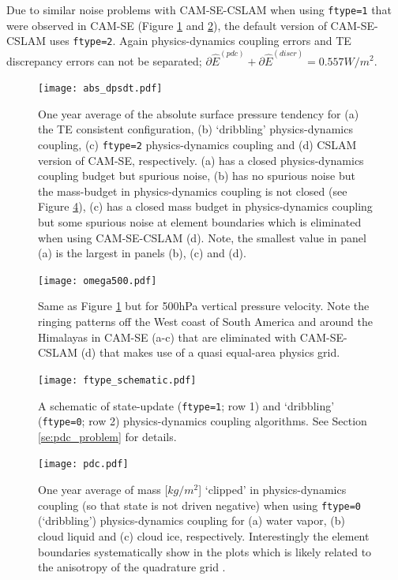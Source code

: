 \documentclass[draft,linenumbers]{agujournal}
\newcommand*{\gi}[1]{\widehat{#1}}
\begin{document}
Due to similar noise problems with CAM-SE-CSLAM when using {\tt{ftype=1}} that were observed in CAM-SE (Figure \ref{fig:abs_dpsdt} and \ref{fig:omega500}), the default version of CAM-SE-CSLAM uses {\tt{ftype=2}}. Again physics-dynamics coupling errors and TE discrepancy errors can not be separated; $\partial \gi{E}^{({pdc})}+\partial \gi{E}^{({discr})} = 0.557W/m^2$.

 \begin{figure}
 \centering
 \texttt{[image: abs\_dpsdt.pdf]}
 \caption{One year average of the absolute surface pressure tendency for (a) the TE consistent configuration, (b) `dribbling' physics-dynamics coupling, (c) {\tt{ftype=2}} physics-dynamics coupling and (d) CSLAM version of CAM-SE, respectively. (a) has a closed physics-dynamics coupling budget but spurious noise, (b) has no spurious noise but the mass-budget in physics-dynamics coupling is not closed (see Figure \ref{fig:pdc}), (c) has a closed mass budget in physics-dynamics coupling but some spurious noise at element boundaries which is eliminated when using CAM-SE-CSLAM (d). Note, the smallest value in panel (a) is the largest in panels (b), (c) and (d).}
 \label{fig:abs_dpsdt}
  \end{figure}


 \begin{figure}
 \centering
 \texttt{[image: omega500.pdf]}
 \caption{Same as Figure \ref{fig:abs_dpsdt} but for 500hPa vertical pressure velocity. Note the ringing patterns off the West coast of South America and around the Himalayas in CAM-SE (a-c) that are eliminated with CAM-SE-CSLAM (d) that makes use of a quasi equal-area physics grid.}
 \label{fig:omega500}
  \end{figure}

 \begin{figure}[h]
 \centering
 \texttt{[image: ftype\_schematic.pdf]}
 \caption{A schematic of state-update ({\tt{ftype=1}}; row 1) and `dribbling' ({\tt{ftype=0}}; row 2) physics-dynamics coupling algorithms. See Section \ref{se:pdc_problem} for details.}
 \label{fig:ftype_schematic}
  \end{figure}



 \begin{figure}
 \centering
 \texttt{[image: pdc.pdf]}
 \caption{One year average of mass [$kg/m^2$] `clipped' in physics-dynamics coupling (so that state is not driven negative) when using {\tt{ftype=0}} (`dribbling') physics-dynamics coupling for (a) water vapor, (b) cloud liquid and (c) cloud ice, respectively. Interestingly the element boundaries systematically show in the plots which is likely related to the anisotropy of the quadrature grid \citep{HetAl2018MWR}.}
 \label{fig:pdc}
  \end{figure}
\end{document}
